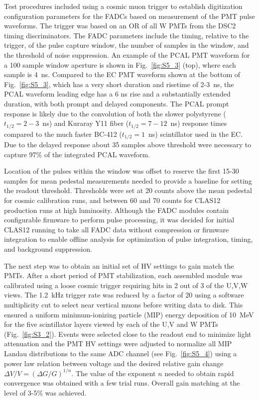 Test procedures included using a cosmic muon trigger to establish digitization configuration parameters for the FADCs based on
measurement of the PMT pulse waveforms.  The trigger was based on an OR of all W PMTs from the DSC2 timing discriminators.
The FADC parameters include the timing, relative to the trigger, of the pulse capture window, the number of samples in the window, and the threshold of noise suppression.  An example of the PCAL PMT waveform for a 100 sample window aperture is shown in Fig.~\ref{fig:S5_3} (top), where each sample is 4~ns. Compared to the EC PMT waveform shown at the bottom of Fig.~\ref{fig:S5_3}, which has a very short duration and risetime of 2-3~ns, the PCAL waveform leading edge has a 6 ns rise and a substantially extended duration, with both prompt and delayed components. The PCAL prompt response is likely due to the convolution of both the slower polystyrene ($t_{1/2}=2-3$~ns) and Kuraray Y11 fiber ($t_{1/2}=7-12$~ns) response times compared
to the much faster BC-412 ($t_{1/2}=1$~ns) scintillator used in the EC. Due to the delayed response about 35
samples above threshold were necessary to capture 97$\%$ of the integrated PCAL waveform.  

Location of the pulses within the window was offset to reserve the first 15-30 samples for mean pedestal measurements needed
to provide a baseline for setting the readout threshold. Thresholds were set at 20 counts above the mean
pedestal for cosmic calibration runs, and between 60 and 70 counts for CLAS12 production runs at high luminosity. Although the FADC modules contain configurable firmware to perform pulse processing, it was decided for initial CLAS12 running to take all FADC data without compression or firmware integration to enable offline analysis for
optimization of pulse integration, timing, and background suppression.

The next step was to obtain an initial set of HV settings to gain match the PMTs. After a short period of PMT
stabilization, each assembled module was calibrated using a loose cosmic trigger requiring hits in 2 out of 3 of
the U,V,W views. The 1.2~kHz trigger rate was reduced by a factor of 20 using a software multiplicity cut to
select near vertical muons before writing data to disk. This ensured a uniform minimum-ionizing particle (MIP)
energy deposition of 10~MeV for the five scintillator layers viewed by each of the U,V and W PMTs (Fig.~\ref{fig:S3_2}). Events were selected
close to the readout end to minimize light attenuation and the PMT HV settings were adjusted to normalize all
MIP Landau distributions to the same ADC channel (see Fig.~\ref{fig:S5_4}) using a power law relation between
voltage and the desired relative gain change $\Delta V/V = (\Delta G/G)^{1/n}$. The value of the exponent $n$
needed to obtain rapid convergence was obtained with a few trial runs. Overall gain matching at the level of
3-5$\%$ was achieved.

